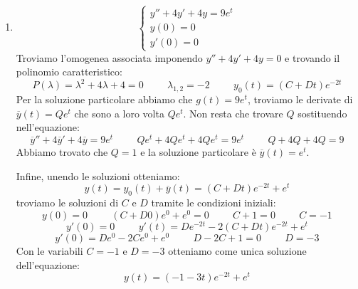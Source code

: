 \begin{exercise}\phantom{}
\begin{enumerate}
    \item \begin{equation*}\begin{cases}y''+4y'+4y=9e^t\\y(0)=0\\y'(0)=0\end{cases}\end{equation*}
    Troviamo l'omogenea associata imponendo $y''+4y'+4y=0$ e trovando il polinomio caratteristico:
    \begin{equation*}
        P(\lambda)=\lambda^2+4\lambda+4=0\hspace{1cm}\lambda_{1,2}=-2\hspace{1cm}y_0(t)=(C+Dt)e^{-2t}
    \end{equation*}
    Per la soluzione particolare abbiamo che $g(t)=9e^t$, troviamo le derivate di $\overline{y}(t)=Qe^t$ che sono a loro volta $Qe^t$.
    Non resta che trovare $Q$ sostituendo nell'equazione:
    \begin{equation*}
        \overline{y}''+4\overline{y}'+4\overline{y}=9e^t\hspace{1cm}Qe^t+4Qe^t+4Qe^t=9e^t\hspace{1cm}Q+4Q+4Q=9
    \end{equation*}
    Abbiamo trovato che $Q=1$ e la soluzione particolare è $\overline{y}(t)=e^t$.
    
    Infine, unendo le soluzioni otteniamo:
    \begin{equation*}
        y(t)=y_0(t)+\overline{y}(t)=(C+Dt)e^{-2t}+e^t
    \end{equation*}
    troviamo le soluzioni di $C$ e $D$ tramite le condizioni iniziali:
    \begin{equation*}y(0)=0\hspace{1cm}(C+D0)e^0+e^0=0\hspace{1cm}C+1=0\hspace{1cm}C=-1\end{equation*}
    \begin{equation*}y'(0)=0\hspace{1cm}y'(t)=De^{-2t}-2(C+Dt)e^{-2t}+e^t\end{equation*}
    \begin{equation*}y'(0)=De^0-2Ce^0+e^0\hspace{1cm}D-2C+1=0\hspace{1cm}D=-3\end{equation*}
    Con le variabili $C=-1$ e $D=-3$ otteniamo come unica soluzione dell'equazione:
    \begin{equation*}
        y(t)=(-1-3t)e^{-2t}+e^t
    \end{equation*}
\end{enumerate}
\end{exercise}